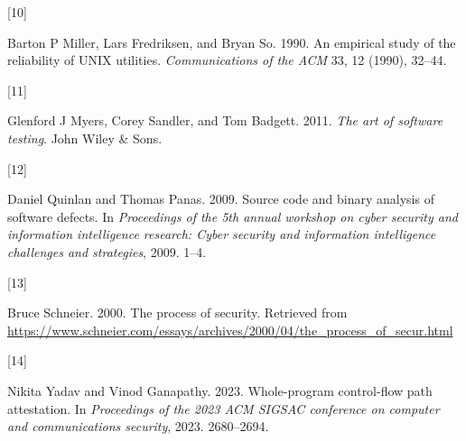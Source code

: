 \documentclass[a4paper, nobind]{templates/ociamthesis}
\newlength{\cslhangindent}
\newlength{\csllabelwidth}
\newenvironment{CSLReferences}[2] %
{\begin{list}{}{%
	\setlength{\itemindent}{0pt}
	\setlength{\leftmargin}{0pt}
	\setlength{\parsep}{0pt}
	\ifodd #1
	\setlength{\leftmargin}{\cslhangindent}
	\setlength{\itemindent}{-1\cslhangindent}
	\fi
	\setlength{\itemsep}{#2\baselineskip}}}
{\end{list}}
\newcommand{\CSLLeftMargin}[1]{\parbox[t]{\csllabelwidth}{\strut#1\strut}}
\newcommand{\CSLRightInline}[1]{\parbox[t]{\linewidth - \csllabelwidth}{\strut#1\strut}}
\begin{document}
\begin{CSLReferences}{0}{0}
\CSLLeftMargin{{[}10{]} }%
\CSLRightInline{Barton P Miller, Lars Fredriksen, and Bryan So. 1990. An empirical study of the reliability of UNIX utilities. \emph{Communications of the ACM} 33, 12 (1990), 32--44.}

\CSLLeftMargin{{[}11{]} }%
\CSLRightInline{Glenford J Myers, Corey Sandler, and Tom Badgett. 2011. \emph{The art of software testing}. John Wiley \& Sons.}

\CSLLeftMargin{{[}12{]} }%
\CSLRightInline{Daniel Quinlan and Thomas Panas. 2009. Source code and binary analysis of software defects. In \emph{Proceedings of the 5th annual workshop on cyber security and information intelligence research: Cyber security and information intelligence challenges and strategies}, 2009. 1--4.}

\CSLLeftMargin{{[}13{]} }%
\CSLRightInline{Bruce Schneier. 2000. The process of security. Retrieved from \url{https://www.schneier.com/essays/archives/2000/04/the_process_of_secur.html}}

\CSLLeftMargin{{[}14{]} }%
\CSLRightInline{Nikita Yadav and Vinod Ganapathy. 2023. Whole-program control-flow path attestation. In \emph{Proceedings of the 2023 ACM SIGSAC conference on computer and communications security}, 2023. 2680--2694.}

\end{CSLReferences}

\end{document}
